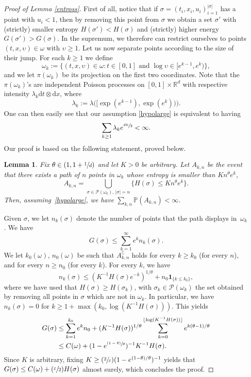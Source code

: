 \documentclass[JEP,XML,SOM,Unicode,published]{cedram}
\let\mathcal\mathscr
\let\sep:
\newcommand{\Psfrac}[2]{(\sfrac{#1}{#2})}
\newcommand{\psfrac}[2]{\sfrac{(#1)}{#2}}
\newtheorem{lemma}[theorem]{Lemma}
\theoremstyle{definition}
\newcommand{\dd}{\mathrm{d}}
\newcommand{\ind}{\mathbf{1}}
\let\cc\complement
\newcommand{\cP}{{\ensuremath{\mathcal P}} }
\newcommand{\bbP}{{\ensuremath{\mathbb P}} }
\newcommand{\bbR}{{\ensuremath{\mathbb R}} }
\let\gep\varepsilon
\let\gl\lambda
\let\ups\upsilon
\let\go\omega
\begin{document}
\begin{proof}[Proof of Lemma \ref{entross}]
First of all, notice that if $\sigma = (t_i,x_i,u_i)_{i=1}^{|\sigma|}$
has a point with $u_i < 1$,
then by removing this point from $\sigma$
we obtain a set $\sigma'$ with (strictly) smaller entropy $H(\sigma') < H(\sigma)$ and (strictly) higher energy $G(\sigma') > G(\sigma)$.
In the supremum, we therefore can restrict ourselves to points
$(t,x,\ups) \in \go$ with $\ups\geq 1$.
Let us now separate points according to the size of their jump.
For each $k\ge 1$ we define
\[
\go_k := \bigl\{ (t,x, \ups)\in \go \sep t\in[0,1] \text{ and } \log \ups \in [ e^{k-1}, e^{k}) \bigr\},
\]
and we let $\pi(\go_k)$ be its projection on the first two coordinates.
Note that the $\pi(\go_k)$'s are independent Poisson processes on $[0,1]\times \bbR^d$ with respective intensity $\lambda_k \dd t\otimes \dd x$, where
\[
\gl_k:= \gl\bigl(\bigl[\exp(e^{k-1}), \exp(e^k) \bigr) \bigr).
\]
One can then easily see that our assumption \eqref{hypolarge}
is equivalent to
having
\begin{equation}
\label{eq:condition}
\sum_{k\ge 1} \gl_k e^{ \sfrac{dk}{2}}<\infty.
\end{equation}
Our proof is based on the following statement, proved below.
\begin{lemma}\label{bcantelli}
Fix $\theta\in \left(1, 1+\sfrac{1}{d}\right)$ and let $K>0$ be arbitrary.
Let $A_{k,n}$ be the event that there exists a path of $n$ points in $\go_k$ whose entropy is smaller than $K n^{\theta} e^{k}$,
\ie 
\[
A_{k,n} = \bigcup_{ \sigma \in \cP(\go_k),\, |\sigma|=n } \bigl\{ H(\sigma) \leq K n^{\theta} e^k \bigr\}.
\]
Then, assuming~\eqref{hypolarge}, we have $\sum_{k,n} \bbP(A_{k,n})<\infty$.
\end{lemma}
 Given $\sigma$, we let $n_k(\sigma)$ denote the number of points that the path displays in~$\go_k$.
We have
\begin{equation}
G(\sigma)\le \sum_{k=1}^{\infty} e^{k} n_k(\sigma).
\end{equation}
We let $k_0(\go)$, $n_0(\go)$ be such that $A_{k,n}^{\cc}$ holds for every $k\ge k_0$ (for every $n$), and for every $n\ge n_0$ (for every $k$).
For every $k$, we have
\begin{equation}
n_k(\sigma)\le (K^{-1} H(\sigma)e^{-k})^{ 1/\theta} +n_0\ind_{\{k\le k_0\}},
\end{equation}
where we have used that $H(\sigma) \geq H(\sigma_k)$, with $\sigma_k \in \cP(\go_k)$ the set obtained by removing all points in $\sigma$ which are not in $\go_k$.
In particular, we have $n_k(\sigma)=0$ for $k\ge 1+ \max(k_0, \log (K^{-1} H(\sigma)))$.
This yields
\begin{align*}
G(\sigma) &\le \sum_{k=1}^{k_0} e^k n_0
+ (K^{-1} H(\sigma))^{1/\theta} \sum_{k=0}^{\lfloor \log (K^{-1}H(\sigma)) \rfloor}
e^{k(\theta-1) /\theta} \\
& \le C(\go)+ (1-e^{\psfrac{1-\theta}{\theta}})^{-1} K^{-1} H(\sigma).
\end{align*}
Since $K$ is arbitrary, fixing $K \geq \Psfrac{2}{\gep} (1-e^{(1-\theta)/\theta})^{-1}$ yields that
$G(\sigma) \leq C(\go) + \Psfrac{\gep}{2} H(\sigma)$ almost surely, which concludes the proof.
\end{proof}
\end{document}
